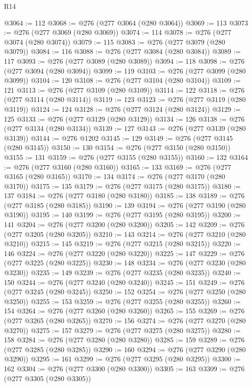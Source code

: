 \begin{lexlean}{R14}
\begin{coremodule}
@3064 := 112
@3068 := @276 (@277 @3064 (@280 @3064))
@3069 := 113
@3073 := @276 (@277 @3069 (@280 @3069))
@3074 := 114
@3078 := @276 (@277 @3074 (@280 @3074))
@3079 := 115
@3083 := @276 (@277 @3079 (@280 @3079))
@3084 := 116
@3088 := @276 (@277 @3084 (@280 @3084))
@3089 := 117
@3093 := @276 (@277 @3089 (@280 @3089))
@3094 := 118
@3098 := @276 (@277 @3094 (@280 @3094))
@3099 := 119
@3103 := @276 (@277 @3099 (@280 @3099))
@3104 := 120
@3108 := @276 (@277 @3104 (@280 @3104))
@3109 := 121
@3113 := @276 (@277 @3109 (@280 @3109))
@3114 := 122
@3118 := @276 (@277 @3114 (@280 @3114))
@3119 := 123
@3123 := @276 (@277 @3119 (@280 @3119))
@3124 := 124
@3128 := @276 (@277 @3124 (@280 @3124))
@3129 := 125
@3133 := @276 (@277 @3129 (@280 @3129))
@3134 := 126
@3138 := @276 (@277 @3134 (@280 @3134))
@3139 := 127
@3143 := @276 (@277 @3139 (@280 @3139))
@3144 := @276 @1202
@3145 := 129
@3149 := @276 (@277 @3145 (@280 @3145))
@3150 := 130
@3154 := @276 (@277 @3150 (@280 @3150))
@3155 := 131
@3159 := @276 (@277 @3155 (@280 @3155))
@3160 := 132
@3164 := @276 (@277 @3160 (@280 @3160))
@3165 := 133
@3169 := @276 (@277 @3165 (@280 @3165))
@3170 := 134
@3174 := @276 (@277 @3170 (@280 @3170))
@3175 := 135
@3179 := @276 (@277 @3175 (@280 @3175))
@3180 := 137
@3184 := @276 (@277 @3180 (@280 @3180))
@3185 := 138
@3189 := @276 (@277 @3185 (@280 @3185))
@3190 := 139
@3194 := @276 (@277 @3190 (@280 @3190))
@3195 := 140
@3199 := @276 (@277 @3195 (@280 @3195))
@3200 := 141
@3204 := @276 (@277 @3200 (@280 @3200))
@3205 := 142
@3209 := @276 (@277 @3205 (@280 @3205))
@3210 := 143
@3214 := @276 (@277 @3210 (@280 @3210))
@3215 := 145
@3219 := @276 (@277 @3215 (@280 @3215))
@3220 := 146
@3224 := @276 (@277 @3220 (@280 @3220))
@3225 := 147
@3229 := @276 (@277 @3225 (@280 @3225))
@3230 := 148
@3234 := @276 (@277 @3230 (@280 @3230))
@3235 := 149
@3239 := @276 (@277 @3235 (@280 @3235))
@3240 := 150
@3244 := @276 (@277 @3240 (@280 @3240))
@3245 := 151
@3249 := @276 (@277 @3245 (@280 @3245))
@3250 := 152
@3254 := @276 (@277 @3250 (@280 @3250))
@3255 := 153
@3259 := @276 (@277 @3255 (@280 @3255))
@3260 := 154
@3264 := @276 (@277 @3260 (@280 @3260))
@3265 := 155
@3269 := @276 (@277 @3265 (@280 @3265))
@3270 := 156
@3274 := @276 (@277 @3270 (@280 @3270))
@3275 := 157
@3279 := @276 (@277 @3275 (@280 @3275))
@3280 := 158
@3284 := @276 (@277 @3280 (@280 @3280))
@3285 := 159
@3289 := @276 (@277 @3285 (@280 @3285))
@3290 := 160
@3294 := @276 (@277 @3290 (@280 @3290))
@3295 := 161
@3299 := @276 (@277 @3295 (@280 @3295))
@3300 := 162
@3304 := @276 (@277 @3300 (@280 @3300))
@3305 := 163
@3309 := @276 (@277 @3305 (@280 @3305))

\end{coremodule}
\end{lexlean}

